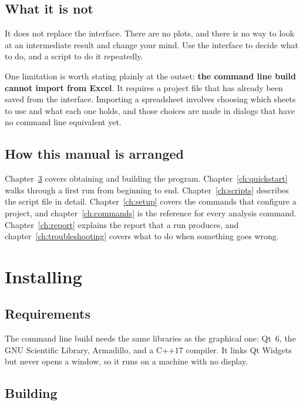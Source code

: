 \documentclass[11pt,a4paper]{report}
\begin{document}
\section{What it is not}

It does not replace the interface. There are no plots, and there is no way to
look at an intermediate result and change your mind. Use the interface to
decide what to do, and a script to do it repeatedly.

One limitation is worth stating plainly at the outset: \textbf{the command line
build cannot import from Excel}. It requires a project file that has already
been saved from the interface. Importing a spreadsheet involves choosing which
sheets to use and what each one holds, and those choices are made in dialogs
that have no command line equivalent yet.

\section{How this manual is arranged}

Chapter~\ref{ch:installing} covers obtaining and building the program.
Chapter~\ref{ch:quickstart} walks through a first run from beginning to end.
Chapter~\ref{ch:scripts} describes the script file in detail.
Chapter~\ref{ch:setup} covers the commands that configure a project, and
chapter~\ref{ch:commands} is the reference for every analysis command.
Chapter~\ref{ch:report} explains the report that a run produces, and
chapter~\ref{ch:troubleshooting} covers what to do when something goes wrong.

\chapter{Installing}
\label{ch:installing}

\section{Requirements}

The command line build needs the same libraries as the graphical one: Qt~6,
the GNU Scientific Library, Armadillo, and a C++17 compiler. It links Qt
Widgets but never opens a window, so it runs on a machine with no display.

\section{Building}
\end{document}
